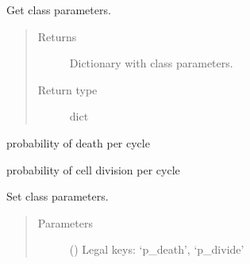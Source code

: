 \documentclass[a4paper,10pt,english]{sphinxmanual}
\begin{document}
\begin{fulllineitems}
\begin{fulllineitems}
\end{fulllineitems}


\begin{fulllineitems}
\label{\detokenize{dish_and_bacteria:biolab.bacteria.Bacteria.get_params}}
Get class parameters.
\begin{quote}\begin{description}
\item[{Returns}] \leavevmode
Dictionary with class parameters.

\item[{Return type}] \leavevmode
dict

\end{description}\end{quote}

\end{fulllineitems}


\begin{fulllineitems}
\label{\detokenize{dish_and_bacteria:biolab.bacteria.Bacteria.p_death}}
probability of death per cycle

\end{fulllineitems}


\begin{fulllineitems}
\label{\detokenize{dish_and_bacteria:biolab.bacteria.Bacteria.p_divide}}
probability of cell division per cycle

\end{fulllineitems}


\begin{fulllineitems}
\label{\detokenize{dish_and_bacteria:biolab.bacteria.Bacteria.set_params}}
Set class parameters.
\begin{quote}\begin{description}
\item[{Parameters}] \leavevmode
{} () \textendash{} Legal keys: ‘p\_death’, ‘p\_divide’


\end{description}
\end{quote}
\end{fulllineitems}
\end{fulllineitems}
\end{document}

